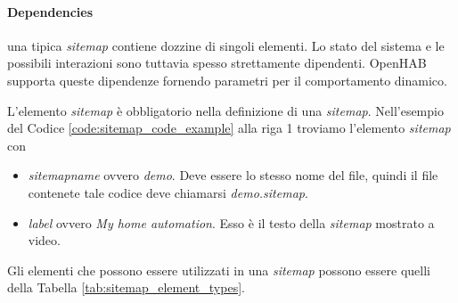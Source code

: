 \paragraph{Dependencies} una tipica {\em sitemap} contiene dozzine di singoli elementi. Lo stato del sistema e le possibili interazioni sono tuttavia spesso strettamente dipendenti. OpenHAB supporta queste dipendenze fornendo parametri per il comportamento dinamico.

L'elemento {\em sitemap} è obbligatorio nella definizione di una {\em sitemap}. Nell'esempio del Codice \ref{code:sitemap_code_example} alla riga 1 troviamo l'elemento {\em sitemap} con
\begin{itemize}
    \item {\em sitemapname} ovvero {\em demo}. Deve essere lo stesso nome del file, quindi il file contenete tale codice deve chiamarsi {\em demo.sitemap}.
    \item {\em label} ovvero {\em My home automation}. Esso è il testo della {\em sitemap} mostrato a video.
\end{itemize}

Gli elementi che possono essere utilizzati in una {\em sitemap} possono essere quelli della Tabella \ref{tab:sitemap_element_types}.

